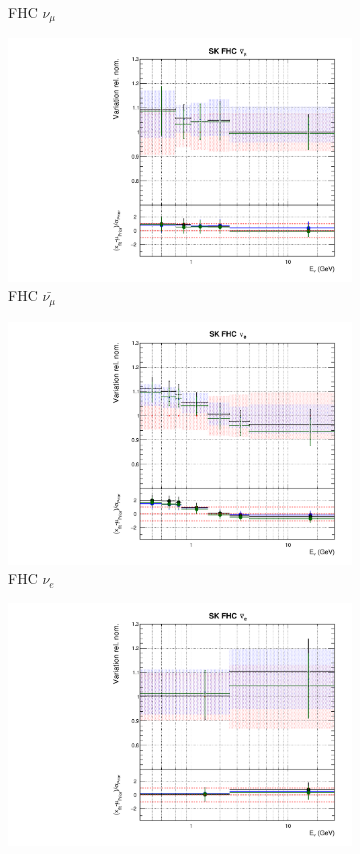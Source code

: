 \begin{figure}[!htbp]
\begin{subfigure}{0.45\textwidth}
  \caption{\SK FHC $\nu_{\mu}$}
\end{subfigure}
\begin{subfigure}{0.45\textwidth}
  \centering
  \includegraphics[width=0.75\linewidth]{figs/polydataflux_9}
  \caption{\SK FHC $\bar{\nu_{\mu}}$}
\end{subfigure}
\begin{subfigure}{0.45\textwidth}
  \centering
  \includegraphics[width=0.75\linewidth]{figs/polydataflux_10}
  \caption{\SK FHC $\nu_e$}
\end{subfigure}
\begin{subfigure}{0.45\textwidth}
  \centering
  \includegraphics[width=0.75\linewidth]{figs/polydataflux_11}

\end{subfigure}
\end{figure}
